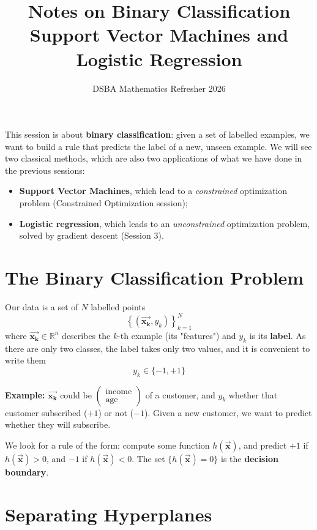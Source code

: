 \documentclass[]{article}
\title{Notes on Binary Classification\\ \large Support Vector Machines and Logistic Regression}
\author{DSBA Mathematics Refresher 2026}
\date{}
\newcommand{\R}{\mathbb{R}}
\newcommand{\vecx}{ \vec{\mathbf{x}} }
\newcommand{\vecxk}{ \vec{\mathbf{x_k}} }
\begin{document}
	\maketitle

	\begin{abstract}

	\end{abstract}

	This session is about \textbf{binary classification}: given a set of labelled examples, we want to build a rule that predicts the label of a new, unseen example.
	We will see two classical methods, which are also two applications of what we have done in the previous sessions:
	\begin{itemize}
		\item \textbf{Support Vector Machines}, which lead to a \textit{constrained} optimization problem (Constrained Optimization session);
		\item \textbf{Logistic regression}, which leads to an \textit{unconstrained} optimization problem, solved by gradient descent (Session 3).
	\end{itemize}

	\section{The Binary Classification Problem}

	Our data is a set of $N$ labelled points
	$$
	\left\{ \left(\vecxk, y_k\right) \right\}_{k=1}^{N}
	$$
	where $\vecxk \in \R^n$ describes the $k$-th example (its "features") and $y_k$ is its \textbf{label}.
	As there are only two classes, the label takes only two values, and it is convenient to write them
	$$
	y_k \in \{-1, +1\}
	$$

	\noindent \textbf{Example:}
	$\vecxk$ could be $\begin{pmatrix} \text{income} \\ \text{age} \end{pmatrix}$ of a customer, and $y_k$ whether that customer subscribed ($+1$) or not ($-1$).
	Given a new customer, we want to predict whether they will subscribe.

	We look for a rule of the form: compute some function $h(\vecx)$, and predict $+1$ if $h(\vecx) > 0$, and $-1$ if $h(\vecx) < 0$.
	The set $\{h(\vecx) = 0\}$ is the \textbf{decision boundary}.

	\section{Separating Hyperplanes}
\end{document}
